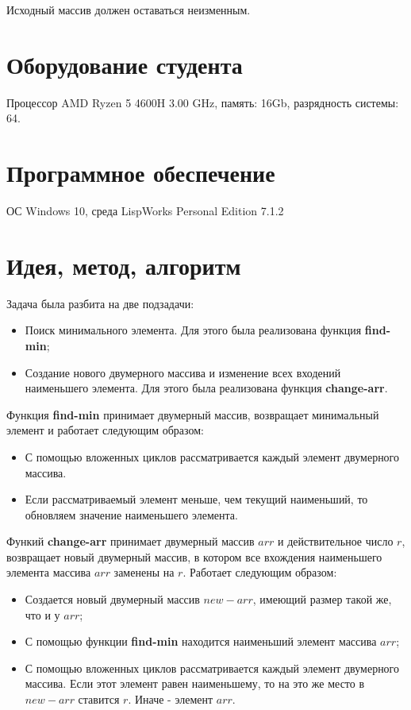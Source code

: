 \documentclass[12pt]{article}
\begin{document}
Исходный массив должен оставаться неизменным.

\section{Оборудование студента}
Процессор AMD Ryzen 5 4600H 3.00 GHz, память: 16Gb, разрядность системы: 64.

\section{Программное обеспечение}
ОС Windows 10, среда LispWorks Personal Edition 7.1.2

\section{Идея, метод, алгоритм}

Задача была разбита на две подзадачи:

\begin{itemize}
    \item Поиск минимального элемента. Для этого была реализована функция \textbf{find-min};
    \item Создание нового двумерного массива и изменение всех входений наименьшего элемента. Для этого была реализована функция \textbf{change-arr}.
\end{itemize}

Функция \textbf{find-min} принимает двумерный массив, возвращает минимальный элемент и работает следующим образом:

\begin{itemize}
    \item С помощью вложенных циклов рассматривается каждый элемент двумерного массива.
    \item Если рассматриваемый элемент меньше, чем текущий наименьший, то обновляем значение наименьшего элемента.
\end{itemize}

Функий \textbf{change-arr} принимает двумерный массив $arr$ и действительное число $r$, возвращает новый двумерный массив, в котором все вхождения наименьшего элемента массива $arr$ заменены на $r$. Работает следующим образом:

\begin{itemize}
    \item Создается новый двумерный массив $new-arr$, имеющий размер такой же, что и у $arr$;
    \item С помощью функции \textbf{find-min} находится наименьший элемент массива $arr$;
    \item С помощью вложенных циклов рассматривается каждый элемент двумерного массива. Если этот элемент равен наименьшему, то на это же место в $new-arr$ ставится $r$. Иначе - элемент $arr$.
\end{itemize}
\end{document}
